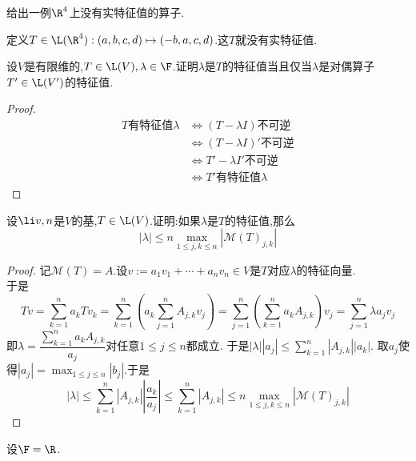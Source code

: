 \documentclass{ctexart}
\begin{document}
\begin{problem}[14.]
    给出一例$\R^4$上没有实特征值的算子.
\end{problem}
\begin{solution}[Solution.]
    定义$T\in\L(\R^4):(a,b,c,d)\mapsto(-b,a,c,d)$.这$T$就没有实特征值.
\end{solution}
\begin{problem}[15.]
    设$V$是有限维的,$T\in\L(V),\lambda\in\F$.证明$\lambda$是$T$的特征值当且仅当$\lambda$是对偶算子$T'\in\L(V')$的特征值.
\end{problem}
\begin{proof}
    $$\begin{aligned}
        T\text{有特征值}\lambda
        &\Leftrightarrow (T-\lambda I)\text{不可逆} \\
        &\Leftrightarrow (T-\lambda I)'\text{不可逆} \\
        &\Leftrightarrow T'-\lambda I'\text{不可逆} \\
        &\Leftrightarrow T'\text{有特征值}\lambda
    \end{aligned}$$
\end{proof}
\begin{problem}[16.]
    设$\li v,n$是$V$的基,$T\in\L(V)$.证明:如果$\lambda$是$T$的特征值,那么
    $$\left|\lambda\right|\leqslant n\max_{1\leqslant j,k\leqslant n}\left|\mathcal{M}(T)_{j,k}\right|$$
\end{problem}
\begin{proof}
    记$\mathcal{M}(T)=A$.设$v:=a_1v_1+\cdots+a_nv_n\in V$是$T$对应$\lambda$的特征向量.\\
    于是$$Tv=\sum_{k=1}^{n}a_kTv_k=\sum_{k=1}^{n}\left(a_k\sum_{j=1}^{n}A_{j,k}v_j\right)=\sum_{j=1}^{n}\left(\sum_{k=1}^{n}a_kA_{j,k}\right)v_j=\sum_{j=1}^{n}\lambda a_jv_j$$
    即$\lambda=\dfrac{\displaystyle\sum_{k=1}^{n}a_kA_{j,k}}{a_j}$对任意$1\leqslant j\leqslant n$都成立.%
    于是$\displaystyle\left|\lambda\right|\left|a_j\right|\leqslant\sum_{k=1}^{n}\left|A_{j,k}\right|\left|a_k\right|$.
    取$a_j$使得$\displaystyle\left|a_j\right|=\max_{1\leqslant j\leqslant n}\left|b_j\right|$.于是
    $$|\lambda|\leqslant\sum_{k=1}^{n}\left|A_{j,k}\right|\left|\dfrac{a_k}{a_j}\right|\leqslant\sum_{k=1}^{n}\left|A_{j,k}\right|\leqslant n\max_{1\leqslant j,k\leqslant n}\left|\mathcal{M}(T)_{j,k}\right|$$
\end{proof}
\begin{problem}[17.]
    设$\F=\R$.
\end{problem}
\end{document}
